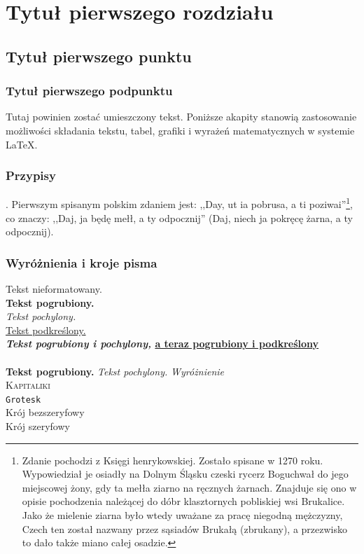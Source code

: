 \chapter{Tytuł pierwszego rozdziału}
\section{Tytuł pierwszego punktu}
\subsection{Tytuł pierwszego podpunktu}

Tutaj powinien zostać umieszczony tekst. Poniższe akapity stanowią zastosowanie możliwości składania tekstu, tabel, grafiki i wyrażeń matematycznych w systemie \LaTeX.

\subsection{Przypisy}\label{przypisy}. 
Pierwszym spisanym polskim zdaniem jest: ,,Day, ut ia pobrusa, a ti poziwai''\footnote{Zdanie pochodzi z Księgi henrykowskiej. Zostało spisane w 1270 roku. Wypowiedział je osiadły na Dolnym Śląsku czeski rycerz Boguchwał do jego miejscowej żony, gdy ta mełła ziarno na ręcznych żarnach. Znajduje się ono w opisie pochodzenia należącej do dóbr klasztornych pobliskiej wsi Brukalice. Jako że mielenie ziarna było wtedy uważane za pracę niegodną mężczyzny, Czech ten został nazwany przez sąsiadów Brukałą (zbrukany), a przezwisko to dało także miano całej osadzie.}, co znaczy: ,,Daj, ja będę mełł, a ty odpocznij'' (Daj, niech ja pokręcę żarna, a ty odpocznij).

\subsection{Wyróżnienia i kroje pisma}
\noindent
Tekst nieformatowany.\\
\textbf{Tekst pogrubiony.}\\
\textit{Tekst pochylony.}\\
\underline{Tekst podkreślony.}\\
\textbf{\textit{Tekst pogrubiony i pochylony, }\underline{a teraz pogrubiony i podkreślony}}\\ \\
{\bf Tekst pogrubiony. }
{\it Tekst pochylony. }
\emph{Wyróżnienie}\\
\textsc{Kapitaliki}\\
\texttt{Grotesk}\\
\textsf{Krój bezszeryfowy}\\
\textrm{Krój szeryfowy }\\

